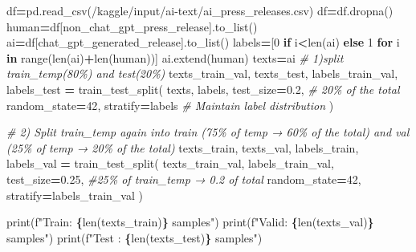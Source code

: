 \documentclass[
]{article}
\newenvironment{Shaded}{\begin{snugshade}}{\end{snugshade}}
\newcommand{\BuiltInTok}[1]{#1}
\newcommand{\CommentTok}[1]{\textcolor[rgb]{0.56,0.35,0.01}{\textit{#1}}}
\newcommand{\ControlFlowTok}[1]{\textcolor[rgb]{0.13,0.29,0.53}{\textbf{#1}}}
\newcommand{\DecValTok}[1]{\textcolor[rgb]{0.00,0.00,0.81}{#1}}
\newcommand{\FloatTok}[1]{\textcolor[rgb]{0.00,0.00,0.81}{#1}}
\newcommand{\KeywordTok}[1]{\textcolor[rgb]{0.13,0.29,0.53}{\textbf{#1}}}
\newcommand{\NormalTok}[1]{#1}
\newcommand{\OperatorTok}[1]{\textcolor[rgb]{0.81,0.36,0.00}{\textbf{#1}}}
\newcommand{\SpecialCharTok}[1]{\textcolor[rgb]{0.81,0.36,0.00}{\textbf{#1}}}
\newcommand{\SpecialStringTok}[1]{\textcolor[rgb]{0.31,0.60,0.02}{#1}}
\newcommand{\StringTok}[1]{\textcolor[rgb]{0.31,0.60,0.02}{#1}}
\begin{document}
\begin{Shaded}
\begin{Highlighting}[]
\NormalTok{df}\OperatorTok{=}\NormalTok{pd.read\_csv(}\StringTok{\textquotesingle{}/kaggle/input/ai{-}text/ai\_press\_releases.csv\textquotesingle{}}\NormalTok{)}
\NormalTok{df}\OperatorTok{=}\NormalTok{df.dropna()}
\NormalTok{human}\OperatorTok{=}\NormalTok{df[}\StringTok{\textquotesingle{}non\_chat\_gpt\_press\_release\textquotesingle{}}\NormalTok{].to\_list()}
\NormalTok{ai}\OperatorTok{=}\NormalTok{df[}\StringTok{\textquotesingle{}chat\_gpt\_generated\_release\textquotesingle{}}\NormalTok{].to\_list()}
\NormalTok{labels}\OperatorTok{=}\NormalTok{[}\DecValTok{0} \ControlFlowTok{if}\NormalTok{ i}\OperatorTok{\textless{}}\BuiltInTok{len}\NormalTok{(ai) }\ControlFlowTok{else} \DecValTok{1} \ControlFlowTok{for}\NormalTok{ i }\KeywordTok{in} \BuiltInTok{range}\NormalTok{(}\BuiltInTok{len}\NormalTok{(ai)}\OperatorTok{+}\BuiltInTok{len}\NormalTok{(human))]}
\NormalTok{ai.extend(human)}
\NormalTok{texts}\OperatorTok{=}\NormalTok{ai}
\CommentTok{\# 1)split train\_temp(80\%) and test(20\%)}
\NormalTok{texts\_train\_val, texts\_test, labels\_train\_val, labels\_test }\OperatorTok{=}\NormalTok{ train\_test\_split(}
\NormalTok{    texts,}
\NormalTok{    labels,}
\NormalTok{    test\_size}\OperatorTok{=}\FloatTok{0.2}\NormalTok{,       }\CommentTok{\# 20\% of the total}
\NormalTok{    random\_state}\OperatorTok{=}\DecValTok{42}\NormalTok{,}
\NormalTok{    stratify}\OperatorTok{=}\NormalTok{labels      }\CommentTok{\# Maintain label distribution}
\NormalTok{)}

\CommentTok{\# 2) Split train\_temp again into train (75\% of temp → 60\% of the total) and val (25\% of temp → 20\% of the total)}
\NormalTok{texts\_train, texts\_val, labels\_train, labels\_val }\OperatorTok{=}\NormalTok{ train\_test\_split(}
\NormalTok{    texts\_train\_val,}
\NormalTok{    labels\_train\_val,}
\NormalTok{    test\_size}\OperatorTok{=}\FloatTok{0.25}\NormalTok{,      }\CommentTok{\#25\% of train\_temp → 0.2 of total}
\NormalTok{    random\_state}\OperatorTok{=}\DecValTok{42}\NormalTok{,}
\NormalTok{    stratify}\OperatorTok{=}\NormalTok{labels\_train\_val}
\NormalTok{)}

\BuiltInTok{print}\NormalTok{(}\SpecialStringTok{f"Train: }\SpecialCharTok{\{}\BuiltInTok{len}\NormalTok{(texts\_train)}\SpecialCharTok{\}}\SpecialStringTok{ samples"}\NormalTok{)}
\BuiltInTok{print}\NormalTok{(}\SpecialStringTok{f"Valid: }\SpecialCharTok{\{}\BuiltInTok{len}\NormalTok{(texts\_val)}\SpecialCharTok{\}}\SpecialStringTok{ samples"}\NormalTok{)}
\BuiltInTok{print}\NormalTok{(}\SpecialStringTok{f"Test : }\SpecialCharTok{\{}\BuiltInTok{len}\NormalTok{(texts\_test)}\SpecialCharTok{\}}\SpecialStringTok{ samples"}\NormalTok{)}
\end{Highlighting}
\end{Shaded}
\end{document}
